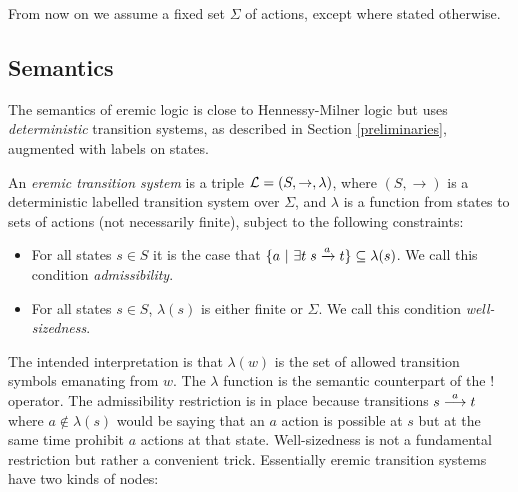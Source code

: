 \begin{convention}
From now on we assume a fixed set $\Sigma$ of actions, except where
stated otherwise.
\end{convention}

\subsection{Semantics}

\NI The semantics of eremic logic is close to Hennessy-Milner logic
\cite{HennessyM:alglawfndac} but uses \emph{deterministic} transition systems, as
described in Section \ref{preliminaries}, augmented with labels on
states.



\begin{definition}
An \emph{eremic transition system} is a triple $\mathcal{L} = (S,
\rightarrow, \lambda)$, where $(S, \rightarrow)$ is a deterministic
labelled transition system over $\Sigma$, and $\lambda$ is a function
from states to sets of actions (not necessarily finite), subject to
the following constraints:
\begin{itemize}

\item For all states $s \in S$ it is the case that $ \{a \ | \  \exists
  t \; s \xrightarrow{a} t\} \subseteq \lambda(s)$. We call this
  condition \emph{admissibility}.

\item For all states $s \in S$, $\lambda (s)$ is either finite or
  $\Sigma$. We call this condition \emph{well-sizedness}.

\end{itemize}
\end{definition}

\NI The intended interpretation is that $\lambda(w)$ is the set of
allowed transition symbols emanating from $w$.  The $\lambda$ function
is the semantic counterpart of the $!$ operator.  The admissibility
restriction is in place because transitions $s \stackrel{a}{\longrightarrow} t$ where $a
\notin \lambda(s)$ would be saying that an $a$ action is possible at
$s$ but at the same time prohibit $a$ actions at that state.
Well-sizedness is not a fundamental restriction but rather a
convenient trick. Essentially eremic transition systems have two kinds
of nodes:

